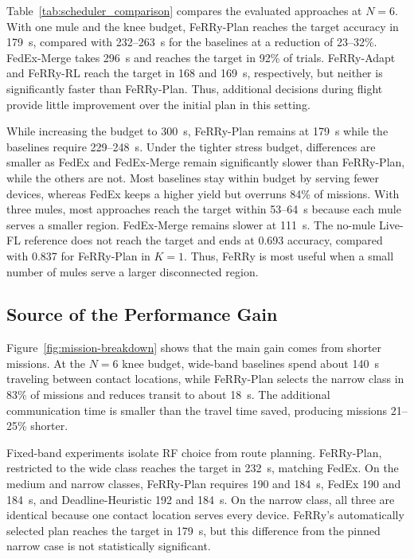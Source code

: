 \documentclass[conference]{IEEEtran}
\newcommand{\sysname}{FeRRy}
\begin{document}
Table~\ref{tab:scheduler_comparison} compares the evaluated approaches at
\(N=6\). With one mule and the knee budget, \sysname{}-Plan reaches the target
accuracy in 179~s, compared with 232--263~s for the baselines at a reduction of
23--32\%. FedEx-Merge takes 296~s and reaches the target in 92\% of trials.
\sysname{}-Adapt and \sysname{}-RL reach the target in 168 and 169~s,
respectively, but neither is significantly faster than \sysname{}-Plan. Thus,
additional decisions during flight provide little improvement over the initial
plan in this setting.


While increasing the budget to 300~s, \sysname{}-Plan remains at 179~s while the baselines require
229--248~s. Under the tighter stress budget, differences are smaller as FedEx and
FedEx-Merge remain significantly slower than \sysname{}-Plan, while the others are not. Most
baselines stay within budget by serving fewer devices, whereas FedEx keeps a
higher yield but overruns 84\% of missions. With three mules, most approaches reach the target within 53--64~s because each
mule serves a smaller region. FedEx-Merge remains slower at 111~s. The no-mule
Live-FL reference does not reach the target and ends at 0.693 accuracy, compared with
0.837 for \sysname{}-Plan in $K=1$. Thus, \sysname{} is most useful when a small number
of mules serve a larger disconnected region.

\subsection{Source of the Performance Gain}
\label{sec:source-gain}
Figure~\ref{fig:mission-breakdown} shows that the main gain comes from shorter
missions. At the \(N=6\) knee budget, wide-band baselines spend about 140~s traveling between contact locations, while \sysname{}-Plan selects the narrow class in 83\% of missions and
reduces transit to about 18~s. The additional communication time is smaller than the
travel time saved, producing missions 21--25\% shorter.

Fixed-band experiments isolate RF choice from route planning.
\sysname{}-Plan, restricted to the wide class reaches the target in 232~s, matching
FedEx. On the medium and narrow classes, \sysname{}-Plan requires 190 and
184~s, FedEx 190 and 184~s, and Deadline-Heuristic 192 and 184~s. On the
narrow class, all three are identical because one contact location serves every device.
\sysname{}'s
automatically selected plan reaches the target in 179~s, but this difference
from the pinned narrow case is not statistically significant.
\end{document}
